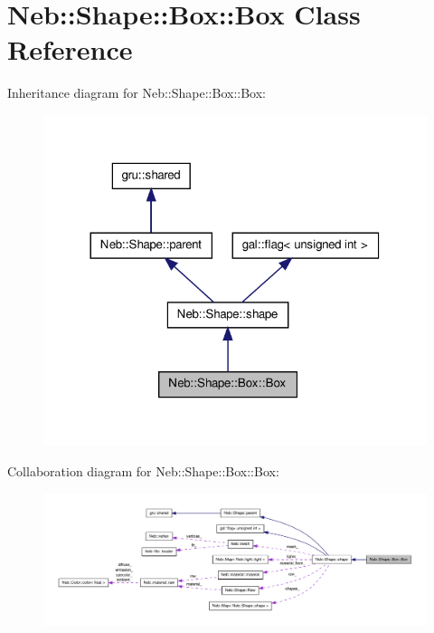 \hypertarget{classNeb_1_1Shape_1_1Box_1_1Box}{\section{\-Neb\-:\-:\-Shape\-:\-:\-Box\-:\-:\-Box \-Class \-Reference}
\label{classNeb_1_1Shape_1_1Box_1_1Box}
}


\-Inheritance diagram for \-Neb\-:\-:\-Shape\-:\-:\-Box\-:\-:\-Box\-:\nopagebreak
\begin{figure}[H]
\begin{center}
\leavevmode
\includegraphics[width=320pt]{classNeb_1_1Shape_1_1Box_1_1Box__inherit__graph}
\end{center}
\end{figure}


\-Collaboration diagram for \-Neb\-:\-:\-Shape\-:\-:\-Box\-:\-:\-Box\-:\nopagebreak
\begin{figure}[H]
\begin{center}
\leavevmode
\includegraphics[width=350pt]{classNeb_1_1Shape_1_1Box_1_1Box__coll__graph}
\end{center}
\end{figure}
